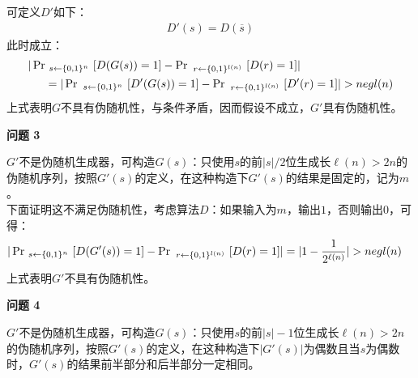 \begin{questions}
\begin{solution}
            可定义$D'$如下：
            \begin{equation}
                \begin{aligned}
                    D'(s)=D(\overline{s})
                \end{aligned}
            \end{equation}
            此时成立：
            \begin{equation}
                \begin{aligned}
                    |\Pr&\ _{s\leftarrow{\set{0,1}^n}}\ [D(G(s))=1]-\Pr\ _{r\leftarrow{\set{0,1}^{l(n)}}}\ [D(r)=1]|\\
                    &=|\Pr\ _{s\leftarrow{\set{0,1}^n}}\ [D'(G(s))=1]-\Pr\ _{r\leftarrow{\set{0,1}^{l(n)}}}\ [D'(r)=1]|>{negl}(n)
                \end{aligned}
            \end{equation}
            上式表明$G$不具有伪随机性，与条件矛盾，因而假设不成立，$G'$具有伪随机性。
            \newline
            \begin{large}
                \textbf{问题 3}
            \end{large}
            \newline
            $G'$不是伪随机生成器，可构造$G(s)$：只使用$s$的前$|s|/2$位生成长$\ell(n)>2n$的伪随机序列，按照$G'(s)$的定义，在这种构造下$G'(s)$的结果是固定的，记为$m$。\\
            下面证明这不满足伪随机性，考虑算法$D$：如果输入为$m$，输出$1$，否则输出$0$，可得：
            \begin{equation}
                \begin{aligned}
                    |\Pr&\ _{s\leftarrow{\set{0,1}^n}}\ [D(G'(s))=1]-\Pr\ _{r\leftarrow{\set{0,1}^{l(n)}}}\ [D(r)=1]|=|1-\frac{1}{2^{\ell(n)}}|>negl(n)
                \end{aligned}
            \end{equation}
            上式表明$G'$不具有伪随机性。
            \newline
            \begin{large}
                \textbf{问题 4}
            \end{large}
            \newline
            $G'$不是伪随机生成器，可构造$G(s)$：只使用$s$的前$|s|-1$位生成长$\ell(n)>2n$的伪随机序列，按照$G'(s)$的定义，在这种构造下$|G'(s)|$为偶数且当$s$为偶数时，$G'(s)$的结果前半部分和后半部分一定相同。\\

\end{solution}
\end{questions}
